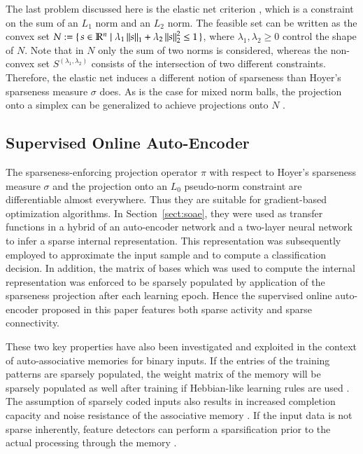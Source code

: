 \documentclass[twoside,11pt]{article}
\newcommand{\R}{\mathbb{R}}
\newcommand{\0}{\mathcal{O}}
\newcommand{\norm}[1]{\left\Vert#1\right\Vert}
\begin{document}
The last problem discussed here is the elastic net criterion \citep{Zou2005}, which is a constraint on the sum of an $L_1$ norm and an $L_2$ norm.
The feasible set can be written as the convex set $N := \set{s\in\R^n | \lambda_1 \norm{s}_1 + \lambda_2\norm{s}_2^2 \leq 1}$, where $\lambda_1,\lambda_2 \geq 0$ control the shape of $N$.
Note that in $N$ only the sum of two norms is considered, whereas the non-convex set $S^{(\lambda_1,\lambda_2)}$ consists of the intersection of two different constraints.
Therefore, the elastic net induces a different notion of sparseness than Hoyer's sparseness measure $\sigma$ does.
As is the case for mixed norm balls, the projection onto a simplex can be generalized to achieve projections onto $N$ \citep{Mairal2010}.

\subsection{Supervised Online Auto-Encoder}
The sparseness-enforcing projection operator $\pi$ with respect to Hoyer's sparseness measure $\sigma$ and the projection onto an $L_0$ pseudo-norm constraint are differentiable almost everywhere.
Thus they are suitable for gradient-based optimization algorithms.
In Section~\ref{sect:soae}, they were used as transfer functions in a hybrid of an auto-encoder network and a two-layer neural network to infer a sparse internal representation.
This representation was subsequently employed to approximate the input sample and to compute a classification decision.
In addition, the matrix of bases which was used to compute the internal representation was enforced to be sparsely populated by application of the sparseness projection after each learning epoch.
Hence the supervised online auto-encoder proposed in this paper features both sparse activity and sparse connectivity.

These two key properties have also been investigated and exploited in the context of auto-associative memories for binary inputs.
If the entries of the training patterns are sparsely populated, the weight matrix of the memory will be sparsely populated as well after training if Hebbian-like learning rules are used \citep{Kohonen1972}.
The assumption of sparsely coded inputs also results in increased completion capacity and noise resistance of the associative memory \citep{Palm1980}.
If the input data is not sparse inherently, feature detectors can perform a sparsification prior to the actual processing through the memory \citep{Baum1988}.
\end{document}
